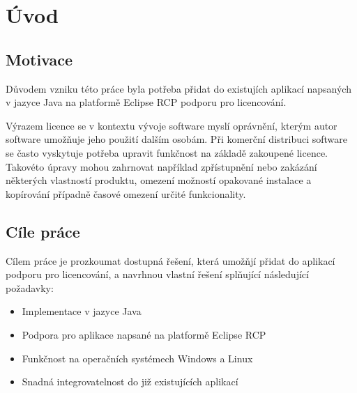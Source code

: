 \chapter{Úvod}

\section{Motivace}

Důvodem vzniku této práce byla potřeba přidat do existujích aplikací napsaných
v jazyce Java na platformě Eclipse RCP podporu pro licencování.

Výrazem licence se v kontextu vývoje software myslí oprávnění, kterým autor
software umožňuje jeho použití dalším osobám. Při komerční distribuci software
se často vyskytuje potřeba upravit funkčnost na základě zakoupené licence.
Takovéto úpravy mohou zahrnovat například zpřístupnění nebo zakázání některých
vlastností produktu, omezení možností opakované instalace a kopírování případně
časové omezení určité funkcionality.

	
\section{Cíle práce}
Cílem práce je prozkoumat dostupná řešení, která umožňjí přidat do aplikací
podporu pro licencování, a navrhnou vlastní řešení splňující následující
požadavky:
\begin{itemize}
  \item Implementace v jazyce Java
  \item Podpora pro aplikace napsané na platformě Eclipse RCP
  \item Funkčnost na operačních systémech Windows a Linux
  \item Snadná integrovatelnost do již existujících aplikací
\end{itemize}
